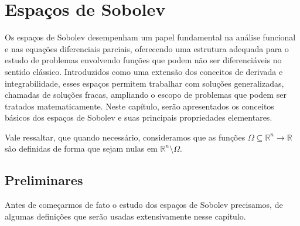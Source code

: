 \documentclass[a4paper, 11pt]{book}
\theoremstyle{definition}
\newcommand{\bN}{\mathbb{N}}
\newcommand{\bR}{\mathbb{R}}
\newcommand{\bK}{\mathbb{K}}
\newcommand{\cC}{\mathcal{C}}
\begin{document}




\chapter{Espaços de Sobolev} \label{ch:sobolev}

Os espaços de Sobolev desempenham um papel fundamental na análise funcional e nas equações diferenciais parciais, oferecendo uma estrutura adequada para o estudo de problemas envolvendo funções que podem não ser diferenciáveis no sentido clássico. Introduzidos como uma extensão dos conceitos de derivada e integrabilidade, esses espaços permitem trabalhar com soluções generalizadas, chamadas de soluções fracas, ampliando o escopo de problemas que podem ser tratados matematicamente. Neste capítulo, serão apresentados os conceitos básicos dos espaços de Sobolev e suas principais propriedades elementares.

Vale ressaltar, que quando necessário, consideramos que as funções $\Omega \subseteq \bR^n \to \bR$ são definidas de forma que sejam nulas em $\bR^n \setminus \Omega$. 

\section{Preliminares}

Antes de começarmos de fato o estudo dos espaços de Sobolev precisamos, de algumas definições que serão usadas extensivamente nesse capítulo.
\end{document}
